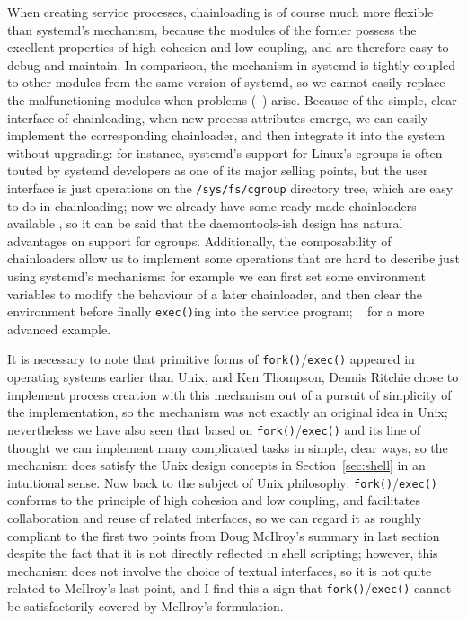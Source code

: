 When creating service processes, chainloading is of course much more flexible
than systemd's mechanism, because the modules of the former possess the
excellent properties of high cohesion and low coupling, and are therefore easy
to debug and maintain.  In comparison, the mechanism in systemd is tightly
coupled to other modules from the same version of systemd, so we cannot easily
replace the malfunctioning modules when problems (\eg~\parencite{edge2017})
arise.  Because of the simple, clear interface of chainloading, when new process
attributes emerge, we can easily implement the corresponding chainloader, and
then integrate it into the system without upgrading: for instance, systemd's
support for Linux's cgroups is often touted by systemd developers as one of its
major selling points, but the user interface is just
operations on the \verb|/sys/fs/cgroup| directory tree, which are easy to do in
chainloading; now we already have some ready-made chainloaders available%
, so it can be said that the daemontools-ish design has
natural advantages on support for cgroups.  Additionally, the composability of
chainloaders allow us to implement some operations that are hard to describe
just using systemd's mechanisms: for example we can first set some environment
variables to modify the behaviour of a later chainloader, and then clear the
environment before finally \verb|exec()|ing into the service program;
\cf~\parencite{ska:syslogd} for a more advanced example.

It is necessary to note that primitive forms of \verb|fork()|/\verb|exec()|
appeared in operating systems earlier than Unix, and
Ken Thompson, Dennis Ritchie \etal{} chose to implement process creation with
this mechanism out of a pursuit of simplicity of the implementation, so the
mechanism was not exactly an original idea in Unix; nevertheless we have also
seen that based on \verb|fork()|/\verb|exec()| and its line of thought we can
implement many complicated tasks in simple, clear ways, so the mechanism does
satisfy the Unix design concepts in Section~\ref{sec:shell} in an intuitional
sense.  Now back to the subject of Unix philosophy: \verb|fork()|/\verb|exec()|
conforms to the principle of high cohesion and low coupling, and facilitates
collaboration and reuse of related interfaces, so we can regard it as roughly
compliant to the first two points from Doug McIlroy's summary in last
section despite the fact that it is not directly reflected in shell
scripting; however, this mechanism does not involve the choice of
textual interfaces, so it is not quite related to McIlroy's last point,
and I find this a sign that \verb|fork()|/\verb|exec()| cannot
be satisfactorily covered by McIlroy's formulation.

